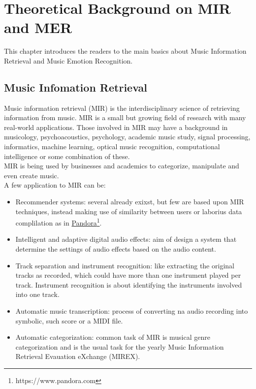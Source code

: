 \chapter{Theoretical Background on MIR and MER}
\label{chap:TheoreticalBackgroundMIRMER}
\thispagestyle{plain}

\vspace{0.5cm}

\noindent This chapter introduces the readers to the main basics about Music Information Retrieval and Music Emotion Recognition.

\section{Music Infomation Retrieval}
Music information retrieval (MIR) is the interdisciplinary science of retrieving information from music. MIR is a small but growing field of research with many real-world applications. Those involved in MIR may have a background in musicology, psychoacoustics, psychology, academic music study, signal processing, informatics, machine learning, optical music recognition, computational intelligence or some combination of these.
\\ \indent
MIR is being used by businesses and academics to categorize, manipulate and even create music.
\\
A few application to MIR can be:
\begin{itemize}
	\item Recommender systems: several already exixst, but few are based upon MIR techniques, instead making use of similarity between users or laborius data complilation as in \href{https://www.pandora.com}{Pandora}\footnote{https://www.pandora.com}.
	\item Intelligent and adaptive digital audio effects: aim of design a system that determine the settings of audio effects based on the audio content.
	\item Track separation and instrument recognition: like extracting the original tracks as recorded, which could have more than one instrument played per track. Instrument recognition is about identifying the instruments involved into one track.
	\item Automatic music transcription: process of converting na audio recording into symbolic, such score or a MIDI file.
	\item Automatic categorization: common task of MIR is musical genre categorization and is the usual task for the yearly Music Information Retrieval Evauation eXchange (MIREX).
\end{itemize}

